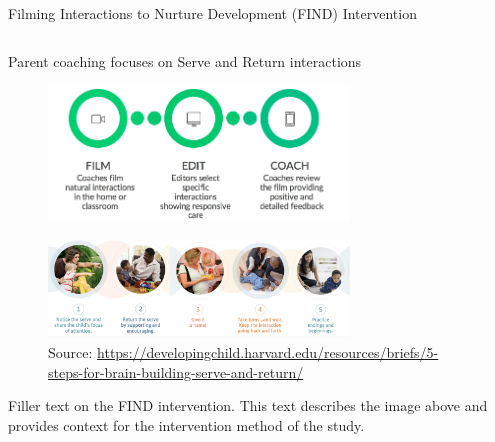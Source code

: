 \documentclass[final]{beamer}
\begin{document}
\begin{frame}[t]
\begin{columns}[t]
\begin{column}{\textwidth}
  \vspace{-15pt}
  \begin{block}{Filming Interactions to Nurture Development (FIND) Intervention}
    \begin{columns}[t]
      \begin{column}{0.48\textwidth}
          \begin{block}{Parent coaching focuses on Serve and Return interactions}
        \begin{figure}[ht]
          \centering
          \includegraphics[clip, width=0.75\textwidth]{find.png}
          \label{fig:find}
        \end{figure}
        \begin{figure}[ht]
          \centering
          \includegraphics[clip, width=0.75\textwidth]{servereturn.png}
          \label{fig:servereturn}
          \\[0.5em]
          {\tiny Source: \url{https://developingchild.harvard.edu/resources/briefs/5-steps-for-brain-building-serve-and-return/}}
        \label{fig:servereturn}
       \end{figure}
             \end{block}

        Filler text on the FIND intervention. This text describes the image above and provides context for the intervention method of the study.

      \end{column}

      \begin{column}{0.48\textwidth}


\end{column}
\end{columns}
\end{block}
\end{column}
\end{columns}
\end{frame}
\end{document}
